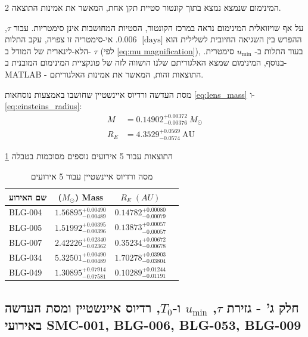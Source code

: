 \documentclass{article}
\begin{document}
\begin{multicols}{2}
המינימום שנמצא נמצא בתוך קונטור סטיית תקן אחת, המאשר את אמינות התוצאה.



על אף שויזואלית המינימום נראה במרכז הקונטור, הסטיות המחושבות אינן סימטריות.
עבור
$\tau$,
ההפרש בין השגיאה החיובית לשלילית הוא
$0.006 \; \text{ [days]}$.
אי-סימטריה זו צפויה, עקב התלות הלא-לינארית של המודל ב-
$\tau$
(לפי
\ref{eq:mu magnification}),
בעוד התלות ב-
$u_{\min}$
סימטרית.
בנוסף, המינימום שמצא האלגוריתם שלנו הושווה לזה של פונקציית המינימום המובנית ב-
\textenglish{MATLAB}
- התוצאות זהות, המאשר את אמינות האלגוריתם.

מסת העדשה ורדיוס איינשטיין שחושבו באמצעות נוסחאות
\ref{eq:lens_mass}
ו-
\ref{eq:einsteins_radius}:
\begin{align}
M &= 0.14902^{+0.00372}_{-0.00376}\ M_{\odot} \\
R_E &= 4.3529^{+0.0569}_{-0.0574}\ \text{AU}
\end{align}

התוצאות עבור 5 אירועים נוספים מסוכמות בטבלה
\ref{tab:Mass_and_Radius_part2}

\begin{table}[H]
\centering
\renewcommand{\arraystretch}{1.4} 
\setlength{\tabcolsep}{5pt}
\begin{tabular}{|l|c|c|c|}
\hline
שם האירוע & ($M_\odot$) Mass  & $R_E \;(AU)$  \\ \hline
BLG-004& $1.56895^{+0.00490}_{-0.00489}$ & $0.14782^{+0.00080}_{-0.00079}$   \\ \hline
BLG-005&
$1.51992^{+0.00395}_{-0.00396}$ & $0.13873^{+0.00057}_{-0.00057}$   \\ \hline
BLG-007 & $2.42226^{+0.02340}_{-0.02362}$& $0.35234^{+0.00672}_{-0.00678}$   \\ \hline
BLG-034 &
$5.32501^{+0.00490}_{-0.00489}$ & $1.70278^{+0.03903}_{-0.03804}$ \\ \hline
BLG-049 &
$1.30895^{+0.07914}_{- 0.07581}$ & $0.10289^{+0.01244}_{-0.01191}$   \\ \hline
\end{tabular}
\caption{מסה ורדיוס איינשטיין עבור 5 אירועים}
\label{tab:Mass_and_Radius_part2}
\end{table}

\subsection{חלק ג' - גזירת $\tau$, $u_{\min}$ ו-$T_0$, רדיוס איינשטיין ומסת העדשה באירועי \textenglish{SMC-001, BLG-006, BLG-053, BLG-009}}


\end{multicols}
\end{document}
